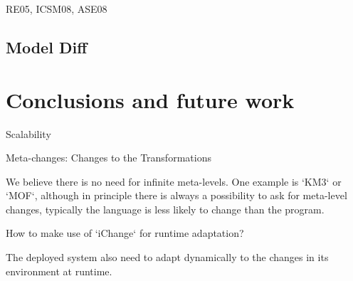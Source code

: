 \documentclass{acm_proc_article-sp}
\begin{document}
   RE05, ICSM08, ASE08
   
\subsection{Model Diff}
\section{Conclusions and future work}

   Scalability
   
   Meta-changes: Changes to the Transformations
   
   We believe there is no need for infinite meta-levels. One example is `KM3` or `MOF`, although in principle there is always a possibility to ask for meta-level 
   changes, typically the language is less likely to change than the program.
   
   How to make use of `iChange` for runtime adaptation?
   
   The deployed system also need to adapt dynamically to the changes in its environment at runtime.
\cite{klint05tosem}  
\cite{cordy02} 
\cite{txl} 
\cite{wenzel08icse} 
\cite{xing05ase} 
\cite{fluri07tse}
\cite{schmidt08icse} 
\cite{wenzel08icsm}
\cite{brunet06gamma}
\cite{degenais08icse}
\cite{canfora09software}


\balancecolumns
\end{document}
